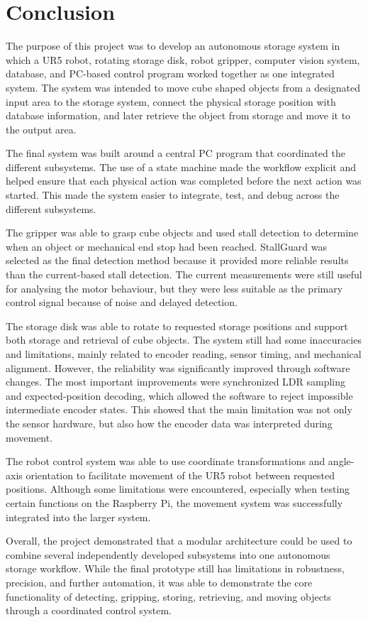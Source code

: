 \section{Conclusion}


The purpose of this project was to develop an autonomous storage system in which a UR5 robot, rotating storage disk, robot gripper, computer vision system, database, and PC-based control program worked together as one integrated system. The system was intended to move cube shaped objects from a designated input area to the storage system, connect the physical storage position with database information, and later retrieve the object from storage and move it to the output area.

The final system was built around a central PC program that coordinated the different subsystems. The use of a state machine made the workflow explicit and helped ensure that each physical action was completed before the next action was started. This made the system easier to integrate, test, and debug across the different subsystems.

The gripper was able to grasp cube objects and used stall detection to determine when an object or mechanical end stop had been reached. StallGuard was selected as the final detection method because it provided more reliable results than the current-based stall detection. The current measurements were still useful for analysing the motor behaviour, but they were less suitable as the primary control signal because of noise and delayed detection.

The storage disk was able to rotate to requested storage positions and support both storage and retrieval of cube objects. The system still had some inaccuracies and limitations, mainly related to encoder reading, sensor timing, and mechanical alignment. However, the reliability was significantly improved through software changes. The most important improvements were synchronized LDR sampling and expected-position decoding, which allowed the software to reject impossible intermediate encoder states. This showed that the main limitation was not only the sensor hardware, but also how the encoder data was interpreted during movement.

The robot control system was able to use coordinate transformations and angle-axis orientation to facilitate movement of the UR5 robot between requested positions. Although some limitations were encountered, especially when testing certain functions on the Raspberry Pi, the movement system was successfully integrated into the larger system.

Overall, the project demonstrated that a modular architecture could be used to combine several independently developed subsystems into one autonomous storage workflow. While the final prototype still has limitations in robustness, precision, and further automation, it was able to demonstrate the core functionality of detecting, gripping, storing, retrieving, and moving objects through a coordinated control system.


